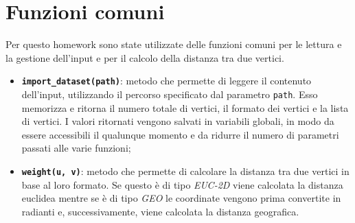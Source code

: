 \section{Funzioni comuni}
Per questo homework sono state utilizzate delle funzioni comuni per le lettura e la gestione dell'input e per il calcolo della distanza tra due vertici.

\begin{itemize}
	\item \texttt{\textbf{import\_dataset(path)}}: metodo che permette di leggere il contenuto dell'input, utilizzando il percorso specificato dal parametro \texttt{path}. Esso memorizza e ritorna il numero totale di vertici, il formato dei vertici e la lista di vertici. I valori ritornati vengono salvati in variabili globali, in modo da essere accessibili il qualunque momento e da ridurre il numero di parametri passati alle varie funzioni; 
	\item \texttt{\textbf{weight(u, v)}}: metodo che permette di calcolare la distanza tra due vertici in base al loro formato. Se questo è di tipo \emph{EUC-2D} viene calcolata la distanza euclidea mentre se è di tipo \emph{GEO} le coordinate vengono prima convertite in radianti e, successivamente, viene calcolata la distanza geografica. 
\end{itemize}

\pagebreak
